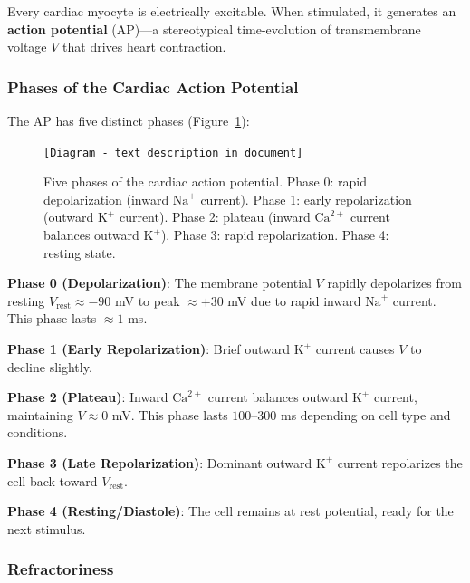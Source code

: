 \documentclass[12pt,a4paper,oneside]{book}
\begin{document}
Every cardiac myocyte is electrically excitable. When stimulated, it generates an \textbf{action potential} (AP)---a stereotypical time-evolution of transmembrane voltage $V$ that drives heart contraction.

\subsubsection{Phases of the Cardiac Action Potential}

The AP has five distinct phases (Figure~\ref{fig:ap_phases}):

\begin{figure}[H]
    \centering
    
    \begin{center}
    \texttt{[Diagram - text description in document]}
    \end{center}
    
    \caption{Five phases of the cardiac action potential. Phase 0: rapid depolarization (inward $\text{Na}^+$ current). Phase 1: early repolarization (outward $\text{K}^+$ current). Phase 2: plateau (inward $\text{Ca}^{2+}$ current balances outward $\text{K}^+$). Phase 3: rapid repolarization. Phase 4: resting state.}
    \label{fig:ap_phases}
\end{figure}

\noindent \textbf{Phase 0 (Depolarization)}: The membrane potential $V$ rapidly depolarizes from resting $V_{\text{rest}} \approx -90$ mV to peak $\approx +30$ mV due to rapid inward $\text{Na}^+$ current. This phase lasts $\approx 1$ ms.

\noindent \textbf{Phase 1 (Early Repolarization)}: Brief outward $\text{K}^+$ current causes $V$ to decline slightly.

\noindent \textbf{Phase 2 (Plateau)}: Inward $\text{Ca}^{2+}$ current balances outward $\text{K}^+$ current, maintaining $V \approx 0$ mV. This phase lasts $100$--$300$ ms depending on cell type and conditions.

\noindent \textbf{Phase 3 (Late Repolarization)}: Dominant outward $\text{K}^+$ current repolarizes the cell back toward $V_{\text{rest}}$.

\noindent \textbf{Phase 4 (Resting/Diastole)}: The cell remains at rest potential, ready for the next stimulus.

\subsubsection{Refractoriness}
\end{document}

